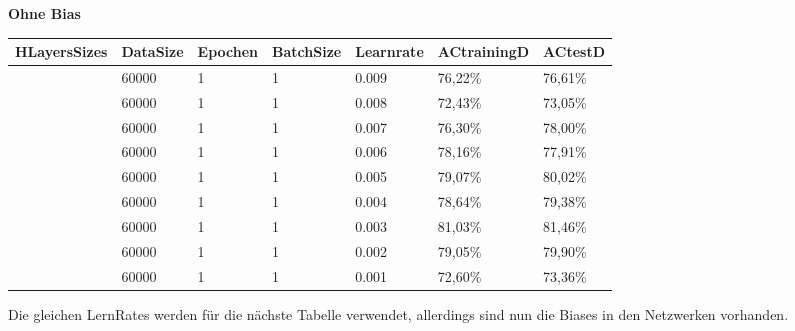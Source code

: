 \documentclass[12pt]{article}
\begin{document}
\begin{table}[H]
    \centering
    \textbf{Ohne Bias}
    \begin{tabular}{|l|l|l|l|l|l|l|}
    \hline
        HLayersSizes & DataSize & Epochen & BatchSize & Learnrate & ACtrainingD & ACtestD \\ \hline
        [784, 100, 10] & 60000 & 1 & 1 & 0.009 & 76,22\% & 76,61\% \\ \hline
        [784, 100, 10] & 60000 & 1 & 1 & 0.008 & 72,43\% & 73,05\% \\ \hline
        [784, 100, 10] & 60000 & 1 & 1 & 0.007 & 76,30\% & 78,00\% \\ \hline
        [784, 100, 10] & 60000 & 1 & 1 & 0.006 & 78,16\% & 77,91\% \\ \hline
        [784, 100, 10] & 60000 & 1 & 1 & 0.005 & 79,07\% & 80,02\% \\ \hline
        [784, 100, 10] & 60000 & 1 & 1 & 0.004 & 78,64\% & 79,38\% \\ \hline
        [784, 100, 10] & 60000 & 1 & 1 & 0.003 & 81,03\% & 81,46\% \\ \hline
        [784, 100, 10] & 60000 & 1 & 1 & 0.002 & 79,05\% & 79,90\% \\ \hline
        [784, 100, 10] & 60000 & 1 & 1 & 0.001 & 72,60\% & 73,36\% \\ \hline
    \end{tabular}
\end{table}

Die gleichen LernRates werden für die nächste Tabelle verwendet, allerdings sind nun die Biases in den Netzwerken vorhanden.
\end{document}
